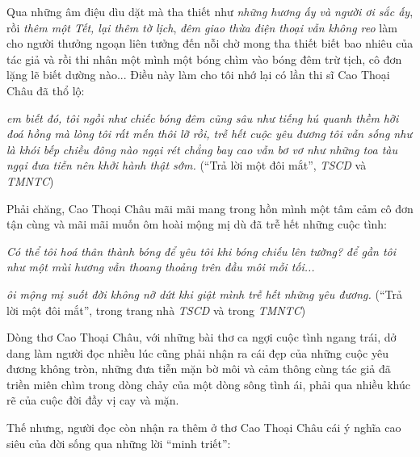 \documentclass[../main.tex]{subfiles}
\begin{document}
\begin{multicols}{2}
\begin{blockquote}
\end{blockquote}
 
Qua những âm điệu dìu dặt mà tha thiết như \textit{những hương ấy và người ơi sắc ấy}, rồi \textit{thêm một Tết, lại thêm tờ lịch}, \textit{đêm giao thừa điện thoại vẫn không reo} làm cho người thưởng ngoạn liên tưởng đến nỗi chờ mong tha thiết biết bao nhiêu của tác giả và rồi thi nhân một mình một bóng chìm vào bóng đêm trừ tịch, cô đơn lặng lẽ biết dường nào... Điều này làm cho tôi nhớ lại có lần thi sĩ Cao Thoại Châu đã thổ lộ: 
\begin{blockquote}
        
\textit{em biết đó, tôi ngồi như chiếc bóng}        
\textit{đêm cũng sâu như tiếng hú quanh thềm}        
\textit{hỡi đoá hồng mà lòng tôi rất mến}        
\textit{thôi lỡ rồi, trễ hết cuộc yêu đương}        
\textit{tôi vẫn sống như là khói bếp}        
\textit{chiều đông nào ngại rét chẳng bay cao}        
\textit{vẫn bơ vơ như những toa tàu}        
\textit{ngại đưa tiễn nên khởi hành thật sớm.}        
(“Trả lời một đôi mắt”, \textit{TSCD} và \textit{TMNTC}) 

\end{blockquote}
 
Phải chăng, Cao Thoại Châu mãi mãi mang trong hồn mình một tâm cảm cô đơn tận cùng và mãi mãi muốn ôm hoài mộng mị dù đã trễ hết những cuộc tình: 
\begin{blockquote}
        
\textit{Có thể tôi hoá thân thành bóng}        
\textit{để yêu tôi khi bóng chiếu lên tường?}        
\textit{để gần tôi như một mùi hương} 
\textit{vẫn thoang thoảng trên đầu môi mỗi tối...} 
        
\textit{ôi mộng mị suốt đời không nỡ dứt}        
\textit{khi giật mình trễ hết những yêu đương.}        
(“Trả lời một đôi mắt”, trong trang nhà \textit{TSCD} và trong \textit{TMNTC}) 

\end{blockquote}
 
Dòng thơ Cao Thoại Châu, với những bài thơ ca ngợi cuộc tình ngang trái, dở dang làm người đọc nhiều lúc cũng phải nhận ra cái đẹp của những cuộc yêu đương không tròn, những đưa tiễn mặn bờ môi và cảm thông cùng tác giả đã triền miên chìm trong dòng chảy của một dòng sông tình ái, phải qua nhiều khúc rẽ của cuộc đời đầy vị cay và mặn.  
 
Thế nhưng, người đọc còn nhận ra thêm ở thơ Cao Thoại Châu cái ý nghĩa cao siêu của đời sống qua những lời “minh triết”: 
\begin{blockquote}
        

\end{blockquote}
\end{multicols}
\end{document}
